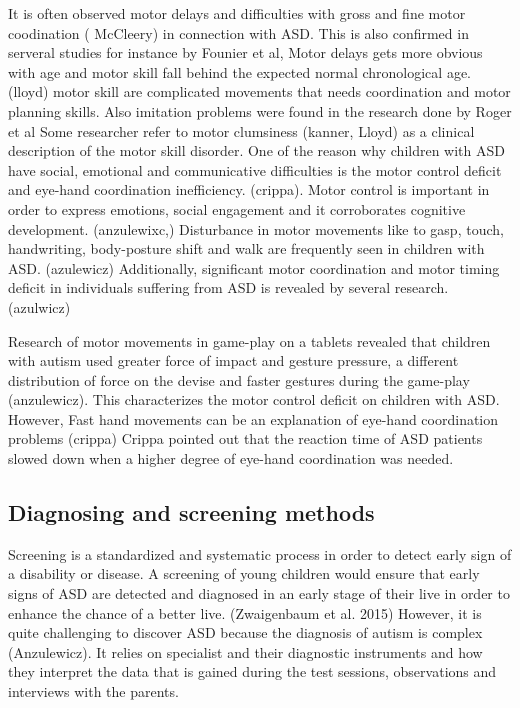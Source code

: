 It is often observed motor delays and difficulties with gross and fine motor coodination ( McCleery) in connection with ASD. This is also confirmed in serveral studies for instance by Founier et al, Motor delays gets more obvious with age and motor skill fall behind the expected normal chronological age. (lloyd) motor skill are complicated movements that needs coordination and motor planning skills. 
Also imitation problems were found in the research done by  Roger et al
Some researcher refer to motor clumsiness (kanner, Lloyd) as a clinical description of the motor skill disorder.
One of the reason why children with ASD have social, emotional and communicative difficulties is the motor control deficit and eye-hand coordination inefficiency. (crippa). Motor control is important in order to express emotions, social engagement and it corroborates cognitive development. (anzulewixc,) 
Disturbance in motor movements like to gasp, touch, handwriting, body-posture shift and walk are frequently seen in children with ASD. (azulewicz) Additionally, significant motor coordination and motor timing deficit in individuals suffering from ASD is revealed by several research. (azulwicz)

Research of motor movements in game-play on a tablets revealed that children with autism used greater force of impact and gesture pressure, a different distribution of force on the devise and faster gestures during the game-play (anzulewicz). This characterizes the motor control deficit on children with ASD. However,  Fast hand movements can be an explanation of eye-hand coordination problems (crippa) Crippa pointed out that the reaction time of ASD patients slowed down  when a higher degree of eye-hand coordination was needed.




\subsection{Diagnosing and screening methods}

Screening is a standardized and systematic process in order to detect early sign of a disability or disease. A screening of young children would ensure that early signs of ASD are detected and diagnosed in an early stage of their live in order to enhance the chance of a better live. (Zwaigenbaum et al. 2015)  
However, it is quite challenging to discover ASD because the diagnosis of autism is complex (Anzulewicz). It relies on specialist and their diagnostic instruments and how they interpret the data that is gained during the test sessions, observations and interviews with the parents.


